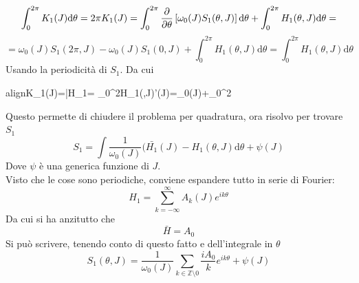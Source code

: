 \documentclass[a4paper,12pt]{article}
\newcommand{\boxedeq}[2]{\begin{empheq}[box={\fboxsep=6pt\fbox}]{align}\label{#1}#2\end{empheq}}
\theoremstyle{plain}
\theoremstyle{definition}
\newcommand{\f}[2]{\frac{#1}{#2}}
\renewcommand{\d}{\text{d}}
\theoremstyle{remark}
\begin{document}
 \[\int_0^{2\pi} K_1(J)\d	\theta=2\pi K_1(J)=\int_0^{2\pi} \pdv{\theta} \left[\omega_0(J)	S_1(\theta,J)\right]\d	\theta+\int_0^{2\pi}H_1(\theta,J)\d	\theta=\]\[=\omega_0(J)	S_1(2\pi,J)-\omega_0(J)	S_1(0,J)+\int_0^{2\pi}H_1(\theta,J)\d	\theta=\int_0^{2\pi}H_1(\theta,J)\d	\theta	\]
Usando la periodicità di $S_1$.
Da cui \boxedeq{bohutile}{K_1(J)=\bar{H_1}=\f{1}{2\pi}	\int_0^{2\pi}H_1(\theta,J)\d	\theta\quad \quad\quad \omega'(J)=\omega_0(J)+\f{\epsilon}{2\pi}\int_0^{2\pi} \pdv{H_1(\theta,I=J)}{J}\d \theta	}
Questo permette di chiudere il problema per quadratura, ora risolvo per trovare $S_1$
\[S_1=\int\f{1}{\omega_0(J)}(\bar{H_1}(J)-H_1(\theta,J)\d \theta+ \psi(J)			\]
Dove $\psi$ è una generica funzione di $J$.
\\ Visto che le cose sono periodiche, conviene espandere tutto in serie di Fourier:
\[H_1=\sum_{k=-\infty}^{\infty}	A_k(J) e^{ik\theta}		\]
Da cui si ha anzitutto che \[\bar{H}=A_0\]
Si può scrivere, tenendo conto di questo fatto e dell'integrale in $\theta$
\[S_1(\theta,J)=\f{1}{\omega_0(J)}\sum_{k\in\mathbb{Z}\setminus 0}	\f{iA_0}{k}	e^{ik\theta}+\psi(J)	\]
\end{document}

